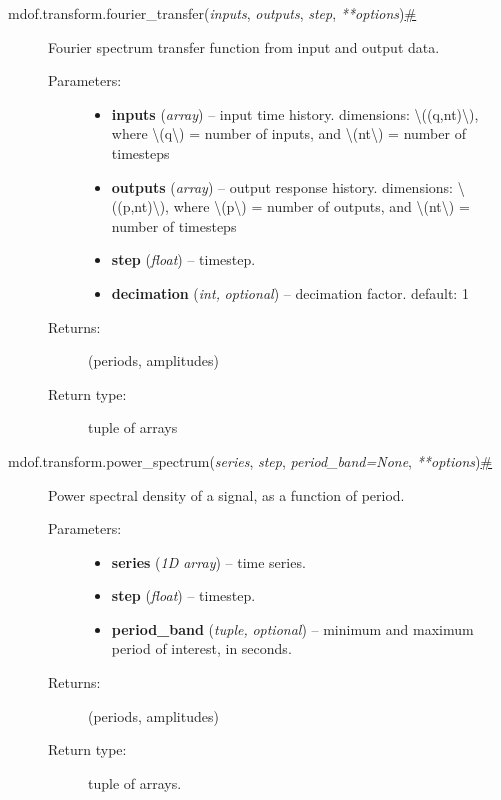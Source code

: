 \begin{description}
\item[{ {{mdof.transform.}}{{fourier\_transfer}}{(}\emph{{{inputs}}},
\emph{{{outputs}}}, \emph{{{step}}},
\emph{{{**}}{{options}}}{)}\protect\hyperlink{mdof.transform.fourier_transfer}{\#}}]
Fourier spectrum transfer function from input and output data.

\begin{description}
\item[Parameters{:}]
\begin{itemize}
\item
  \textbf{inputs} (\emph{array}) -- input time history. dimensions:
  {\textbackslash{}((q,nt)\textbackslash{})}, where
  {\textbackslash{}(q\textbackslash{})} = number of inputs, and
  {\textbackslash{}(nt\textbackslash{})} = number of timesteps
\item
  \textbf{outputs} (\emph{array}) -- output response history.
  dimensions: {\textbackslash{}((p,nt)\textbackslash{})}, where
  {\textbackslash{}(p\textbackslash{})} = number of outputs, and
  {\textbackslash{}(nt\textbackslash{})} = number of timesteps
\item
  \textbf{step} (\emph{float}) -- timestep.
\item
  \textbf{decimation} (\emph{int,} \emph{optional}) -- decimation
  factor. default: 1
\end{itemize}
\item[Returns{:}]
(periods, amplitudes)
\item[Return type{:}]
tuple of arrays
\end{description}
\end{description}

\begin{description}
\item[{ {{mdof.transform.}}{{power\_spectrum}}{(}\emph{{{series}}},
\emph{{{step}}}, \emph{{{period\_band}}{{=}}{{None}}},
\emph{{{**}}{{options}}}{)}\protect\hyperlink{mdof.transform.power_spectrum}{\#}}]
Power spectral density of a signal, as a function of period.

\begin{description}
\item[Parameters{:}]
\begin{itemize}
\item
  \textbf{series} (\emph{1D array}) -- time series.
\item
  \textbf{step} (\emph{float}) -- timestep.
\item
  \textbf{period\_band} (\emph{tuple,} \emph{optional}) -- minimum and
  maximum period of interest, in seconds.
\end{itemize}
\item[Returns{:}]
(periods, amplitudes)
\item[Return type{:}]
tuple of arrays.
\end{description}
\end{description}

